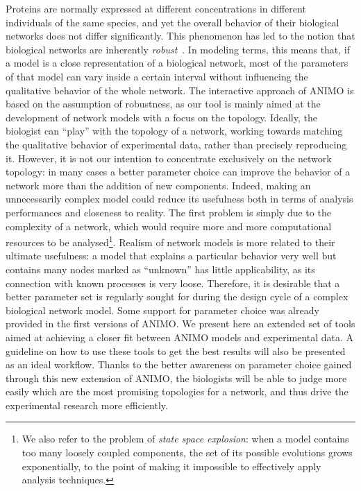 \documentclass[submission,copyright,creativecommons]{eptcs}
\begin{document}
Proteins are normally expressed at different concentrations in different individuals of the same species, and yet the
overall behavior of their biological networks does not differ significantly. This phenomenon has led to the notion that biological
networks are inherently \emph{robust}~\cite{bio-robust1, bio-robust2}. In modeling terms, this means that,
if a model is a close representation of a biological network, most of the parameters of that model
can vary inside a certain interval without influencing the qualitative behavior of the whole network.
The interactive approach of ANIMO is based on the assumption of robustness, as our tool is mainly aimed at the
development of network models with a focus on the topology.
Ideally, the biologist can ``play'' with the topology of a network, working
towards matching the qualitative behavior of experimental data, rather than precisely reproducing it.
However, it is not our intention to concentrate exclusively on the network topology:
in many cases a better parameter choice can improve the behavior of a network more than the addition of new components.
Indeed, making an unnecessarily complex model could reduce its usefulness both in terms of analysis
performances and closeness to reality. The first problem is simply due to the complexity of a network,
which would require more and more computational resources to be analysed\footnote{We also refer to the
problem of \emph{state space explosion}: when a model contains too many loosely coupled components,
the set of its possible evolutions grows exponentially, to the point of making it impossible to effectively apply analysis
techniques.}.
Realism of network models is more related to their
ultimate usefulness: a model that explains a particular behavior very well but contains many nodes marked
as ``unknown'' has little applicability, as its connection with known processes is very loose.
Therefore, it is desirable that a better parameter set is regularly sought for during the design cycle of
a complex biological network model. Some support for parameter choice was already provided in the first versions of ANIMO.
We present here an extended set of tools aimed at achieving a closer fit between ANIMO models and experimental data.
A guideline on how to use these tools to get the best results will also be presented as an ideal workflow.
Thanks to the better awareness on parameter choice gained through this new extension of ANIMO, the biologists
will be able to judge more easily which are the most promising topologies for a network, and thus drive
the experimental research more efficiently.
\end{document}
